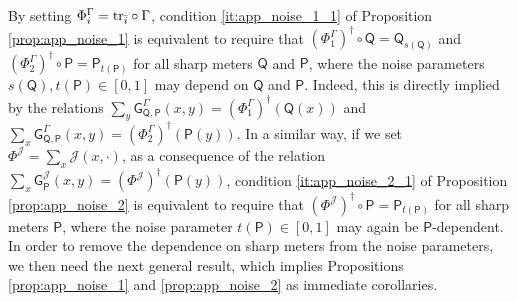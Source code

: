 \documentclass[12pt,reqno]{amsart}
\theoremstyle{definition}
\newcommand{\ptr}[2]{{\rm tr}_{#1} #2} %
\newcommand{\Qo}{\mathsf{Q}}%
\newcommand{\Po}{\mathsf{P}}%
\newcommand{\Go}{\mathsf{G}}%
\newcommand{\ii}{\mathcal{J}}
\begin{document}
By setting $\Phi^\Gamma_i = \ptr{\bar{i}}\circ\Gamma$, condition \eqref{it:app_noise_1_1} of Proposition \ref{prop:app_noise_1} is equivalent to require that $(\Phi^\Gamma_1)^\dag\circ\Qo = \Qo_{s(\Qo)}$ and $(\Phi^\Gamma_2)^\dag\circ\Po = \Po_{t(\Po)}$ for all sharp meters $\Qo$ and $\Po$, where the noise parameters $s(\Qo),t(\Po)\in [0,1]$ may depend on $\Qo$ and $\Po$. Indeed, this is directly implied by the relations $\sum_y \Go^\Gamma_{\Qo,\Po}(x,y) = (\Phi^\Gamma_1)^\dag(\Qo(x))$ and $\sum_x \Go^\Gamma_{\Qo,\Po}(x,y) = (\Phi^\Gamma_2)^\dag(\Po(y))$. In a similar way, if we set $\Phi^\ii = \sum_x\ii(x,\cdot)$, as a consequence of the relation $\sum_x \Go^\ii_\Po(x,y) = (\Phi^\ii)^\dag(\Po(y))$, condition \eqref{it:app_noise_2_1} of Proposition \ref{prop:app_noise_2} is equivalent to require that $(\Phi^\ii)^\dag\circ\Po = \Po_{t(\Po)}$ for all sharp meters $\Po$, where the noise parameter $t(\Po)\in [0,1]$ may again be $\Po$-dependent. In order to remove the dependence on sharp meters from the noise parameters, we then need the next general result, which implies Propositions \ref{prop:app_noise_1} and \ref{prop:app_noise_2} as immediate corollaries.
\end{document}
